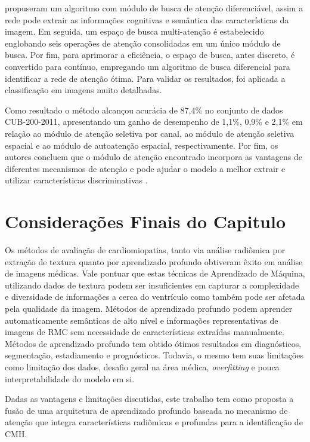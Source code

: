  propuseram um algoritmo com módulo de busca de atenção diferenciável, assim a rede pode extrair as informações cognitivas e semântica das características da imagem. Em seguida, um espaço de busca multi-atenção é estabelecido englobando seis operações de atenção consolidadas em um único módulo de busca. Por fim, para aprimorar a eficiência, o espaço de busca, antes discreto, é convertido para contínuo, empregando um algoritmo de busca diferencial para identificar a rede de atenção ótima. Para validar os resultados, foi aplicada a classificação em imagens  muito detalhadas. 

Como resultado o método alcançou acurácia de 87,4\% no conjunto de dados CUB-200-2011, apresentando um ganho de desempenho de 1,1\%, 0,9\% e 2,1\% em relação ao módulo de atenção seletiva por canal, ao módulo de atenção seletiva espacial e ao módulo de autoatenção espacial, respectivamente. Por fim, os autores concluem que o módulo de atenção encontrado incorpora as vantagens de diferentes mecanismos de atenção e pode ajudar o modelo a melhor extrair e utilizar características discriminativas \cite{yangNeuralNetworkDesign2024a}.




\section{Considerações Finais do Capitulo}
\label{sec:consideracoes_finais}

Os métodos de avaliação de cardiomiopatias, tanto via análise radiômica por extração de textura quanto por aprendizado profundo obtiveram êxito em análise de imagens médicas. Vale pontuar que estas técnicas de Aprendizado de Máquina, utilizando dados de textura podem ser insuficientes em capturar a complexidade e diversidade de informações a cerca do ventrículo como também pode ser afetada pela qualidade da imagem. Métodos de aprendizado profundo podem aprender automaticamente semânticas de alto nível e informações representativas de imagens de \gls{RMC} sem necessidade de características extraídas manualmente.
Métodos de aprendizado profundo tem obtido ótimos resultados em diagnósticos, segmentação, estadiamento e prognósticos. Todavia, o mesmo tem suas limitações como limitação dos dados, desafio geral na área médica, \textit{overfitting} e pouca interpretabilidade do modelo em si.

Dadas as vantagens e limitações discutidas, este trabalho tem como proposta a fusão de uma arquitetura de aprendizado profundo baseada no mecanismo de atenção que integra características radiômicas e profundas para a identificação de \gls{CMH}. 

